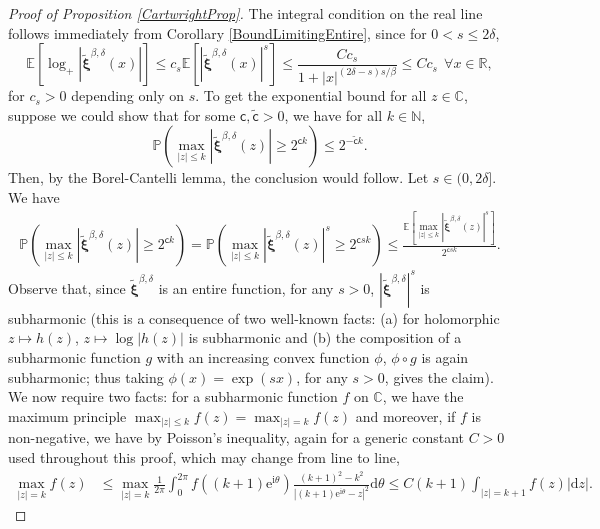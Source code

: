 \documentclass[]{article}
\begin{document}
\begin{proof}[Proof of Proposition \ref{CartwrightProp}] The integral condition on the real line follows immediately from Corollary \ref{BoundLimitingEntire}, since for $0 < s\le2\delta$,
\begin{equation*}
\mathbb{E}\left[\log_+ \left|\tilde{\boldsymbol{\xi}}^{\beta,\delta}(x)\right|\right] \leq c_s \mathbb{E}\left[\left|\tilde{\boldsymbol{\xi}}^{\beta,\delta}(x)\right|^{s}\right]\le \frac{C c_s}{1+|x|^{(2\delta-s)s/\beta}} \le C c_s\ \ \forall x\in \mathbb{R},
\end{equation*}
for $c_s > 0$ depending only on $s$. 
To get the exponential bound for all $z\in \mathbb{C}$, suppose we could show that for some $\mathsf{c},\tilde{\mathsf{c}}>0$, we have for all $k\in \mathbb{N}$,
\begin{equation}\label{ProbBound}
\mathbb{P}\left(\max_{|z|\le k}\left|\tilde{\boldsymbol{\xi}}^{\beta,\delta}(z)\right|\ge 2^{\mathsf{c}k}\right)\le 2^{-\tilde{\mathsf{c}}k}.
\end{equation}
Then, by the Borel-Cantelli lemma, the conclusion would follow. Let $s \in (0,2\delta]$. We have
\begin{align*}
\mathbb{P}\left(\max_{|z|\le k}\left|\tilde{\boldsymbol{\xi}}^{\beta,\delta}(z)\right|\ge 2^{\mathsf{c}k}\right)=\mathbb{P}\left(\max_{|z|\le k}\left|\tilde{\boldsymbol{\xi}}^{\beta,\delta}(z)\right|^s\ge 2^{\mathsf{c}sk}\right)\le \frac{\mathbb{E}\left[\max_{|z|\le k} \left|\tilde{\boldsymbol{\xi}}^{\beta,\delta}(z)\right|^s\right]}{2^{\mathsf{c}sk}}.
\end{align*}
Observe that, since $\tilde{\boldsymbol{\xi}}^{\beta,\delta}$ is an entire function, for any $s>0$, $|\tilde{\boldsymbol{\xi}}^{\beta,\delta}|^s$ is subharmonic (this is a consequence of two well-known facts: (a) for holomorphic $z \mapsto h(z)$, $z\mapsto \log|h(z)|$ is subharmonic and (b) the composition of a subharmonic function $g$ with an increasing convex function $\phi$, $\phi\circ g$ is again subharmonic; thus taking $\phi(x)=\exp(sx)$, for any $s>0$, gives the claim). We now require two facts: for a subharmonic function $f$ on $\mathbb{C}$, we have the maximum principle $\max_{|z|\le k} f(z)=\max_{|z|=k}f(z)$ and moreover, if $f$ is non-negative, we have by Poisson's inequality, again for a generic constant $C>0$ used throughout this proof, which may change from line to line,
\begin{align*}
\max_{|z|=k} f(z)&\le \max_{|z|=k}\frac{1}{2\pi}\int_{0}^{2\pi}f\left((k+1)\mathrm{e}^{\mathrm{i}\theta}\right)\frac{(k+1)^2-k^2}{\left|(k+1)\mathrm{e}^{\mathrm{i}\theta}-z\right|^2}\mathrm{d}\theta \le C(k+1)\int_{|z|=k+1}f(z)|\mathrm{d}z|.

\end{align*}
\end{proof}
\end{document}
